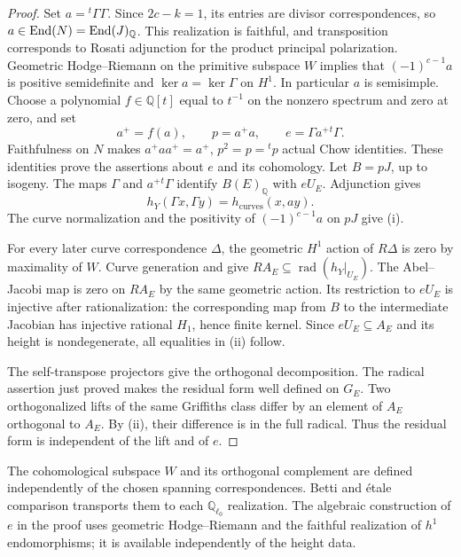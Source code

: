 \documentclass[11pt,a4paper]{article}
\newtheorem{lemma}[theorem]{Lemma}
\theoremstyle{definition}
\newcommand{\Q}{\mathbb Q}\newcommand{\R}{\mathbb R}\newcommand{\C}{\mathbb C}
\newcommand{\rad}{\operatorname{rad}}\newcommand{\rk}{\operatorname{rank}}
\numberwithin{equation}{section}
\begin{document}
\begin{proof}
Set \(a={}^t\Gamma\Gamma\). Since \(2c-k=1\), its entries are
divisor correspondences, so \(a\in\End(N)=\End(J)_\Q\).
This realization is faithful, and transposition corresponds to
Rosati adjunction for the product principal polarization.
Geometric Hodge--Riemann on the primitive subspace \(W\) implies
that \((-1)^{c-1}a\) is positive semidefinite and
\(\ker a=\ker\Gamma\) on \(H^1\). In particular \(a\) is
semisimple. Choose a polynomial \(f\in\Q[t]\) equal to
\(t^{-1}\) on the nonzero spectrum and zero at zero, and set
\[
 a^+=f(a),\qquad p=a^+a,\qquad
 e=\Gamma a^+{}^t\Gamma.
\]
Faithfulness on \(N\) makes \(a^+aa^+=a^+\), \(p^2=p={}^tp\)
actual Chow identities. These identities prove the assertions about
\(e\) and its cohomology. Let \(B=pJ\), up to isogeny.
The maps \(\Gamma\) and \(a^+{}^t\Gamma\) identify
\(B(E)_\Q\) with \(eU_E\). Adjunction gives
\[
 h_Y(\Gamma x,\Gamma y)=h_{\mathrm{curves}}(x,ay).
\]
The curve normalization and the positivity of
\((-1)^{c-1}a\) on \(pJ\) give (i).

For every later curve correspondence \(\Delta\), the geometric
\(H^1\) action of \(R\Delta\) is zero by maximality of \(W\).
Curve generation and  give
\(RA_E\subseteq\rad(h_Y|_{U_E})\). The Abel--Jacobi map is zero
on \(RA_E\) by the same geometric action. Its restriction to
\(eU_E\) is injective after rationalization: the corresponding
map from \(B\) to the intermediate Jacobian has injective rational
\(H_1\), hence finite kernel. Since \(eU_E\subseteq A_E\) and
its height is nondegenerate, all equalities in (ii) follow.

The self-transpose projectors give the orthogonal decomposition.
The radical assertion just proved makes the residual form well
defined on \(G_E\). Two orthogonalized lifts of the same Griffiths
class differ by an element of \(A_E\) orthogonal to \(A_E\).
By (ii), their difference is in the full radical. Thus the residual
form is independent of the lift and of \(e\).
\end{proof}

The cohomological subspace \(W\) and its orthogonal complement are
defined independently of the chosen spanning correspondences. Betti
and étale comparison transports them to each \(\Q_{\ell_0}\)
realization. The algebraic construction of \(e\) in the proof uses
geometric Hodge--Riemann and the faithful realization of \(h^1\)
endomorphisms; it is available independently of the height data.

\end{document}
